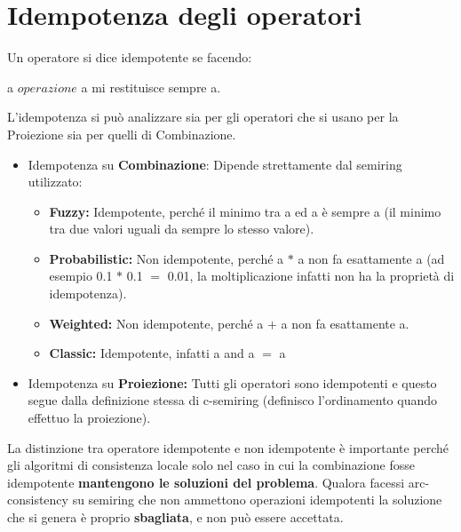 \section{Idempotenza degli operatori}
Un operatore si dice idempotente se facendo:
\begin{center}
    a $operazione$ a mi restituisce sempre a.
\end{center}
L'idempotenza si può analizzare sia per gli operatori che si usano per la
Proiezione sia per quelli di Combinazione.\\
\begin{itemize}
    \item Idempotenza su \textbf{Combinazione}: Dipende strettamente dal
          semiring utilizzato:
          \begin{itemize}
              \item \textbf{Fuzzy:} Idempotente, perché il minimo tra a ed a è
                    sempre a (il minimo tra due valori uguali da sempre lo stesso
                    valore).
              \item \textbf{Probabilistic:} Non idempotente, perché a $*$ a non
                    fa esattamente a (ad esempio 0.1 $*$ 0.1 $=$ 0.01, la
                    moltiplicazione infatti non ha la proprietà di idempotenza).
              \item \textbf{Weighted:} Non idempotente, perché a $+$ a non fa
                    esattamente a.
              \item \textbf{Classic:} Idempotente, infatti a and a $=$ a
          \end{itemize}
    \item Idempotenza su \textbf{Proiezione:} Tutti gli operatori sono
          idempotenti e questo segue dalla definizione stessa di c-semiring (definisco
          l'ordinamento quando effettuo la proiezione).
\end{itemize}
La distinzione tra operatore idempotente e non idempotente è importante perché
gli algoritmi di consistenza locale solo nel caso in cui la combinazione fosse
idempotente \textbf{mantengono le soluzioni del problema}. Qualora facessi
arc-consistency su semiring che non ammettono operazioni idempotenti la
soluzione che si genera è proprio \textbf{sbagliata}, e non può essere
accettata.
\vspace{1cm}

